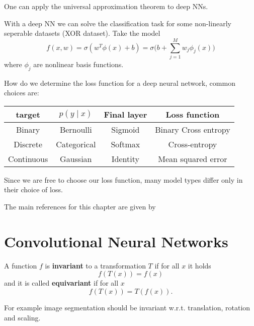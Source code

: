 \documentclass[12 pt]{article}        	%
\begin{document}
One can apply the universal approximation theorem to deep NNs.

\begin{exmp}
    With a deep NN we can solve the classification task for some non-linearly seperable datasets (XOR dataset).
    Take the model 
    \[
        f ( x , w ) 
        = 
        \sigma ( w^T \phi ( x ) + b ) 
        = 
        \sigma \bigg( b + \sum_{ j = 1 }^M w_j \phi_j ( x ) \bigg) 
    \]
    where $ \phi_j $ are nonlinear basis functions.
\end{exmp}

\begin{rmk}
    How do we determine the loss function for a deep neural network, common choices are:
    \begin{center}
    \begin{tabular}{c|c|c|c}
         target & $ p ( y \mid x ) $ & Final layer & Loss function \\
         \hline
         Binary &  Bernoulli & Sigmoid & Binary Cross entropy \\
         Discrete & Categorical & Softmax & Cross-entropy \\
         Continuous & Gaussian & Identity & Mean squared error
    \end{tabular}
    \end{center}

    Since we are free to choose our loss function, many model types differ only in their choice of loss.
\end{rmk}

The main references for this chapter are given by
\begin{center}
    \cite[ch. 3,4,5]{prince2023understanding}
\end{center}

\section{Convolutional Neural Networks}

\begin{defi}
    A function $ f $ is \textbf{invariant} to a transformation $ T $ if for all $ x $ it holds 
    \[
        f ( T ( x ) ) 
        =
        f ( x ) 
    \]
    and it is called \textbf{equivariant} if for all $ x $
    \[
        f ( T ( x ) ) 
        = 
        T ( f ( x ) ). 
    \]
\end{defi}


For example image segmentation should be invariant w.r.t. translation, rotation and scaling.
\end{document}
